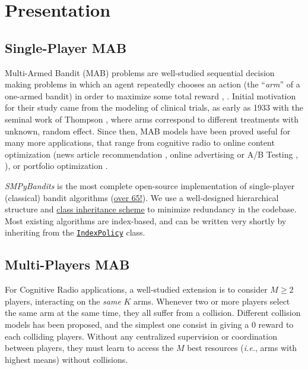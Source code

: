 \documentclass[a4paper,10pt,]{article}
\begin{document}

\section{Presentation}\label{presentation}

\subsection{Single-Player MAB}\label{single-player-mab}

Multi-Armed Bandit (MAB) problems are well-studied sequential decision
making problems in which an agent repeatedly chooses an action (the
``\emph{arm}'' of a one-armed bandit) in order to maximize some total
reward \citep{Robbins52}, \citep{LaiRobbins85}. Initial motivation for
their study came from the modeling of clinical trials, as early as 1933
with the seminal work of Thompson \citep{Thompson33}, where arms
correspond to different treatments with unknown, random effect. Since
then, MAB models have been proved useful for many more applications,
that range from cognitive radio \citep{Jouini09} to online content
optimization (news article recommendation \citep{Li10}, online
advertising \citep{LiChapelle11} or A/B Testing \citep{Kaufmann14},
\citep{Jamieson17}), or portfolio optimization \citep{Sani12}.

\emph{SMPyBandits} is the most complete open-source implementation of
single-player (classical) bandit algorithms
(\href{https://smpybandits.github.io/docs/Policies.html}{over 65!}). We
use a well-designed hierarchical structure and
\href{https://smpybandits.github.io/uml_diagrams/README.html}{class
inheritance scheme} to minimize redundancy in the codebase. Most
existing algorithms are index-based, and can be written very shortly by
inheriting from the
\href{https://smpybandits.github.io/docs/Policies.IndexPolicy.html}{\texttt{IndexPolicy}}
class.

\subsection{Multi-Players MAB}\label{multi-players-mab}

For Cognitive Radio applications, a well-studied extension is to
consider \(M\geq2\) players, interacting on the \emph{same} \(K\) arms.
Whenever two or more players select the same arm at the same time, they
all suffer from a collision. Different collision models has been
proposed, and the simplest one consist in giving a \(0\) reward to each
colliding players. Without any centralized supervision or coordination
between players, they must learn to access the \(M\) best resources
(\emph{i.e.}, arms with highest means) without collisions.
\end{document}
